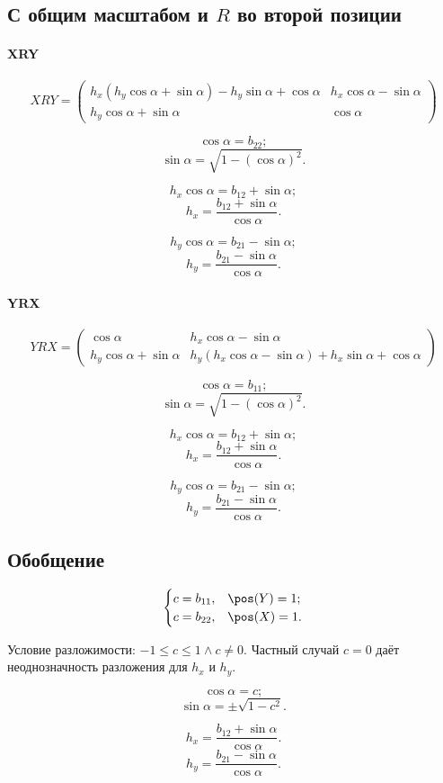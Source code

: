 \subsection{С общим масштабом и $R$ во второй позиции}
\paragraph{XRY}

\[
XRY =
\begin{pmatrix}
	{h_x} \left( {h_y} \cos\alpha + \sin\alpha\right) - {h_y}\sin\alpha + \cos\alpha &
	{h_x} \cos\alpha - \sin\alpha\\
	{h_y} \cos\alpha + \sin\alpha & 
	\cos\alpha
\end{pmatrix}
\]

$$\cos\alpha = b_{22};$$
$$\sin\alpha = \sqrt{1- (\cos\alpha)^2}.$$

$${h_x} \cos\alpha = b_{12} + \sin\alpha;$$
$$h_x = \frac{b_{12} + \sin\alpha}{\cos\alpha}.$$

$${h_y} \cos\alpha = b_{21} - \sin\alpha;$$ 
$$h_y = \frac{b_{21} - \sin\alpha}{\cos\alpha}.$$


\paragraph{YRX}

\[
YRX = 
\begin{pmatrix}
	\cos\alpha & 
	{h_x} \cos\alpha - \sin\alpha\\
	{h_y} \cos\alpha + \sin\alpha & 
	{h_y} \left( {h_x}\cos\alpha - \sin\alpha\right) + {h_x}\sin\alpha + \cos\alpha
\end{pmatrix}
\]

$$\cos\alpha = b_{11};$$
$$\sin\alpha = \sqrt{1- (\cos\alpha)^2}.$$

$${h_x} \cos\alpha = b_{12} + \sin\alpha;$$
$$h_x = \frac{b_{12} + \sin\alpha}{\cos\alpha}.$$

$${h_y} \cos\alpha = b_{21} - \sin\alpha;$$ 
$$h_y = \frac{b_{21} - \sin\alpha}{\cos\alpha}.$$


\subsection{Обобщение}

$$\begin{cases}
	c = b_{11}, & \pos(Y) = 1;\\
	c = b_{22}, & \pos(X) = 1.
\end{cases}$$

Условие разложимости: $-1 \le c \le 1 \wedge c \ne 0$.
Частный случай $c = 0$ даёт неоднозначность разложения для $h_x$ и $h_y$.

$$\cos\alpha = c;$$
$$\sin\alpha = \pm \sqrt{1 - c^2}.$$

$$h_x = \frac{b_{12} + \sin\alpha}{\cos\alpha}.$$
$$h_y = \frac{b_{21} - \sin\alpha}{\cos\alpha}.$$
